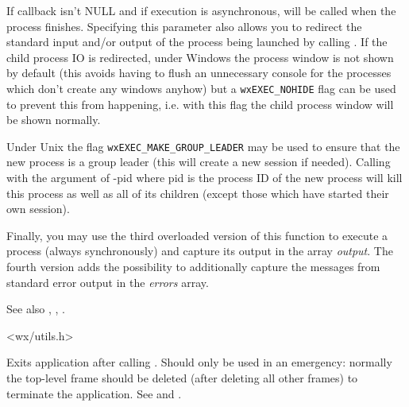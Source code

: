 If callback isn't NULL and if execution is asynchronous, 
 will be called when
the process finishes. Specifying this parameter also allows you to redirect the
standard input and/or output of the process being launched by calling 
. If the child process IO is redirected,
under Windows the process window is not shown by default (this avoids having to
flush an unnecessary console for the processes which don't create any windows
anyhow) but a {\tt wxEXEC\_NOHIDE} flag can be used to prevent this from
happening, i.e. with this flag the child process window will be shown normally.

Under Unix the flag {\tt wxEXEC\_MAKE\_GROUP\_LEADER} may be used to ensure
that the new process is a group leader (this will create a new session if
needed). Calling  with the argument of -pid where pid
is the process ID of the new process will kill this process as well as all of
its children (except those which have started their own session).

Finally, you may use the third overloaded version of this function to execute
a process (always synchronously) and capture its output in the array
{\it output}. The fourth version adds the possibility to additionally capture
the messages from standard error output in the {\it errors} array.

See also , ,
.







<wx/utils.h>

\label{wxexit}


Exits application after calling .
Should only be used in an emergency: normally the top-level frame
should be deleted (after deleting all other frames) to terminate the
application. See  and .

